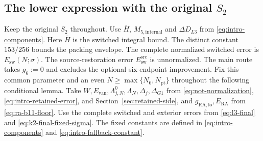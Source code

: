 \subsection{\texorpdfstring{The lower expression with the original $S_2$}{The lower expression with the original S2}}

Keep the original \(S_2\) throughout.
Use $\overline H$, $M_{5,\mathrm{internal}}$ and $\Delta D_{L3}$
from \eqref{eq:intro-components}.
Here $\overline H$ is the switched integral bound.
The distinct constant $153/256$ bounds the packing envelope.
The complete normalized switched error is $E_{\mathrm{sw}}(N;\sigma)$.
The source-restoration error $E_{\mathrm{sw}}^{\mathrm{src}}$ is unnormalized.
The main route takes $g_6:=0$ and excludes the optional six-endpoint
improvement.
Fix this common parameter and an even \(N\ge\max\{N_6,N_{\mathrm{pt}}\}\)
throughout the following conditional lemma. Take
\(W,E_{\mathrm{van}},\Lambda^0_{j,N},\Lambda_N,\Delta_j,\Delta_{G1}\)
from \eqref{eq:not-normalization}, \eqref{eq:intro-retained-error}, and
Section~\ref{sec:retained-side}, and \(g_{\mathrm{RA,lo}},E_{\mathrm{RA}}\)
from \eqref{eq:ra-b11-floor}. Use the complete switched and exterior
errors from \eqref{eq:l3-final} and \eqref{eq:k2-final-fixed-sigma}.
The fixed constants are defined in \eqref{eq:intro-components}
and \eqref{eq:intro-fallback-constant}.

